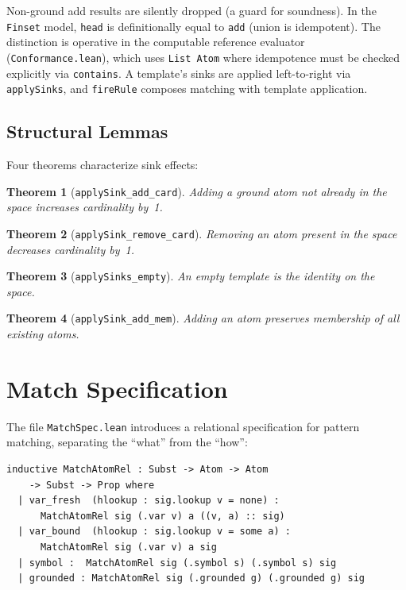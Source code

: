 \documentclass[11pt]{article}
\newtheorem{theorem}{Theorem}[section]
\theoremstyle{definition}
\theoremstyle{remark}
\begin{document}
\noindent
Non-ground add results are silently dropped (a guard for soundness).
In the \texttt{Finset} model, \texttt{head} is definitionally equal to
\texttt{add} (union is idempotent).  The distinction is operative in the
computable reference evaluator (\texttt{Conformance.lean}), which uses
\texttt{List Atom} where idempotence must be checked explicitly via
\texttt{contains}.
A template's sinks are applied left-to-right via \texttt{applySinks},
and \texttt{fireRule} composes matching with template application.

\subsection{Structural Lemmas}

Four theorems characterize sink effects:

\begin{theorem}[\texttt{applySink\_add\_card}]
Adding a ground atom not already in the space increases cardinality by~1.
\end{theorem}

\begin{theorem}[\texttt{applySink\_remove\_card}]
Removing an atom present in the space decreases cardinality by~1.
\end{theorem}

\begin{theorem}[\texttt{applySinks\_empty}]
An empty template is the identity on the space.
\end{theorem}

\begin{theorem}[\texttt{applySink\_add\_mem}]
Adding an atom preserves membership of all existing atoms.
\end{theorem}

\section{Match Specification}
\label{sec:matchspec}

The file \texttt{MatchSpec.lean} introduces a relational specification for
pattern matching, separating the ``what'' from the ``how'':

\begin{lstlisting}[caption={Match relation (\texttt{MatchSpec.lean}).}]
inductive MatchAtomRel : Subst -> Atom -> Atom
    -> Subst -> Prop where
  | var_fresh  (hlookup : sig.lookup v = none) :
      MatchAtomRel sig (.var v) a ((v, a) :: sig)
  | var_bound  (hlookup : sig.lookup v = some a) :
      MatchAtomRel sig (.var v) a sig
  | symbol :  MatchAtomRel sig (.symbol s) (.symbol s) sig
  | grounded : MatchAtomRel sig (.grounded g) (.grounded g) sig
\end{lstlisting}
\end{document}
